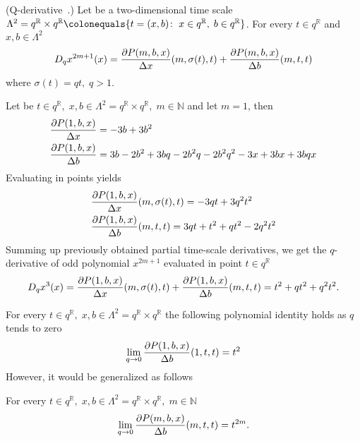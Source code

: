\begin{cor}
    \label{q_derivative_case}
    (Q-derivative~\cite{jackson_1909}.)
    Let be a two-dimensional time scale
    $\Lambda^2 = q^{\mathbb{R}} \times q^{\mathbb{R}} \colonequals \{t=(x,b) \colon \; x\in q^{\mathbb{R}}, \; b \in q^{\mathbb{R}} \}$.
    For every $t\in q^{\mathbb{R}}$ and $x,b\in \Lambda^2$
    \begin{align*}
        D_{q} x^{2m+1}(x)
        = \frac{\partial P ( m, b, x )}{\Delta x} (m, \sigma(t), t)
        + \frac{\partial P ( m, b, x )}{\Delta b} (m, t, t)
    \end{align*}
    where $\sigma(t) = qt, \; q > 1$.
\end{cor}
\begin{examp}
    \label{time_scale_qn_example_1}
    Let be $t\in q^{\mathbb{R}}, \; x,b\in \Lambda^2 = q^{\mathbb{R}} \times q^{\mathbb{R}}, \; m\in\mathbb{N}$
    and let $m=1$, then
    \begin{align*}
        &\frac{\partial P ( 1, b, x )}{\Delta x} = -3 b + 3 b^2 \\
        &\frac{\partial P ( 1, b, x )}{\Delta b} = 3 b - 2 b^2 + 3 b q - 2 b^2 q - 2 b^2 q^2 - 3 x + 3 b x + 3 b q x
    \end{align*}
    Evaluating in points yields
    \begin{align*}
        &\frac{\partial P ( 1, b, x )}{\Delta x} (m, \sigma(t), t) = -3 q t + 3 q^2 t^2 \\
        &\frac{\partial P ( 1, b, x )}{\Delta b} (m, t, t) = 3 q t + t^2 + q t^2 - 2 q^2 t^2
    \end{align*}
    Summing up previously obtained partial time-scale derivatives, we get the $q$-derivative of odd polynomial
    $x^{2m+1}$ evaluated in point $t\in q^{\mathbb{R}}$
    \begin{align*}
        D_{q} x^{3}(x)
        = \frac{\partial P ( 1, b, x )}{\Delta x} (m, \sigma(t), t)
        + \frac{\partial P ( 1, b, x )}{\Delta b} (m, t, t)
        = t^2 + q t^2 + q^2 t^2.
    \end{align*}
\end{examp}
For every $t\in q^{\mathbb{R}}, \; x,b\in \Lambda^2 = q^{\mathbb{R}} \times q^{\mathbb{R}}$
the following polynomial identity holds as $q$ tends to zero
\begin{align*}
    \lim \limits_{q \to 0} \frac{\partial P ( 1, b, x )}{\Delta b} (1, t, t) = t^2
\end{align*}
However, it would be generalized as follows
\begin{cor}
    \label{time_scale_qn_corollary_1}
    For every $t\in q^{\mathbb{R}}, \; x,b\in \Lambda^2 = q^{\mathbb{R}} \times q^{\mathbb{R}}, \; m\in\mathbb{N}$
    \begin{align*}
        \lim \limits_{q \to 0} \frac{\partial P ( m, b, x )}{\Delta b} (m, t, t) = t^{2m}.
    \end{align*}
\end{cor}
